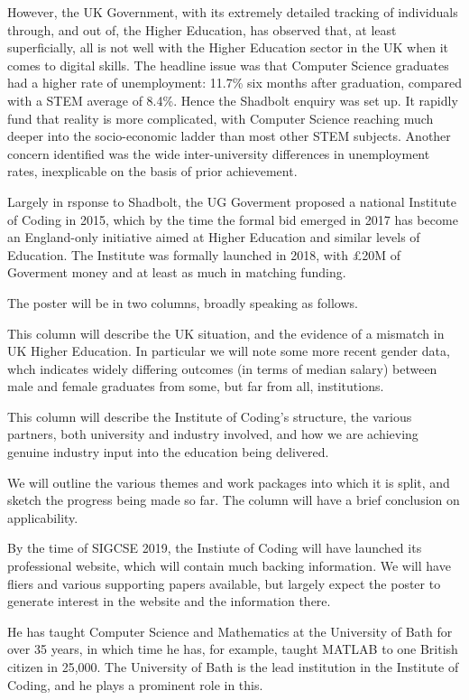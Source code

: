 \documentclass[11pt]{article} %
\begin{document}
However, the UK Government, with its extremely detailed tracking of individuals through, and out of, the Higher Education, has observed that, at least superficially, all is not well with the Higher Education sector in the UK when it comes to digital skills. The headline issue was that Computer Science graduates had a higher rate of unemployment: 11.7\%  six months after graduation, compared with a STEM average of 8.4\%. Hence the Shadbolt enquiry was set up. It rapidly fund that reality is more complicated, with Computer Science reaching much deeper into the socio-economic ladder than most other STEM subjects.  Another concern identified was the wide inter-university differences in unemployment rates, inexplicable on the basis of prior achievement.

Largely in rsponse to Shadbolt, the UG Goverment proposed a national Institute of Coding in 2015, which by the time the formal bid emerged in 2017 has become an England-only initiative aimed at Higher Education and similar levels of Education.  The Institute was formally launched in 2018, with \pounds20M of Goverment money and at least as much in matching funding.

\medskip
{}\noindent
The poster will be in two columns, broadly speaking as follows.


\medskip
{}\noindent
This column will describe the UK situation, and the evidence of a mismatch in UK Higher Education.  In particular we will note some more recent gender data, whch indicates widely differing outcomes (in terms of median salary) between male and female graduates from some, but far from all, institutions.


\medskip
{}\noindent
This column will describe the Institute of Coding's structure, the various partners, both university and industry involved, and how we are achieving genuine industry input into the education being delivered.

We will outline the various themes and work packages into which it is split, and sketch the progress being made so far.
The column will have a brief conclusion on applicability.

\medskip
{}\noindent
By the time of SIGCSE 2019, the Instiute of Coding will have launched its professional website, which will contain much backing information. We will have fliers and various supporting papers available, but largely expect the poster to generate interest in the website and the information there.

\noindent
He has taught Computer Science and Mathematics at the University of Bath for over 35 years, in which time he has, for example, taught MATLAB to one British citizen in 25,000. The University of Bath is the lead institution in the Institute of Coding, and he plays a prominent role in this.
\end{document}
